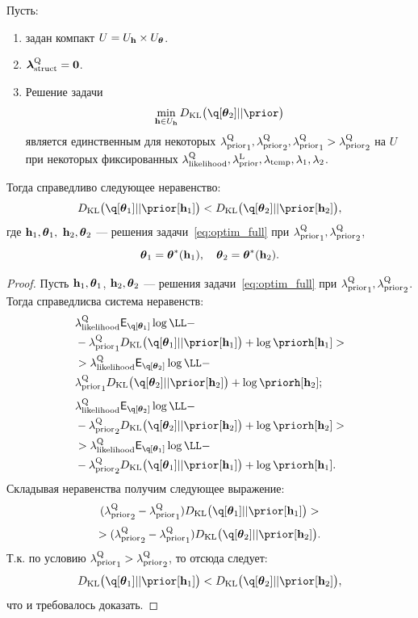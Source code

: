 \begin{lemma}
\label{lem:cp}
Пусть:
\begin{enumerate}
\item задан компакт $U = U_{\mathbf{h}} \times U_{\boldsymbol{\theta}}$. 
\item $\boldsymbol{\lambda}_\text{struct}^\text{Q}=\mathbf{0}$.
\item Решение задачи
\begin{equation}
\label{eq:cp_theorem_kl}
\min_{\h \in \Uh} \KL{\q[\teta_2]}{\prior}
\end{equation}
 является единственным для некоторых ${\lambda_\text{prior}^\text{Q}}_1, {\lambda_\text{prior}^\text{Q}}_2, {\lambda_\text{prior}^\text{Q}}_1 > {\lambda_\text{prior}^\text{Q}}_2$ на $U$ при некоторых фиксированных $\lambda_\text{likelihood}^\text{Q}, \lambda_\text{prior}^\text{L}, \lambda_{\text{temp}}, \lambda_1, \lambda_2$.
\end{enumerate}

Тогда справедливо следующее неравенство:
\[
    \KL{\q[\teta_1]}{\prior[\h_1]}  <   \KL{\q[\teta_2]}{\prior[\h_2]},
\]
где $\mathbf{h}_1, \boldsymbol{\theta}_1,$ $\mathbf{h}_2, \boldsymbol{\theta}_2$  --- решения задачи~\eqref{eq:optim_full} при ${\lambda_\text{prior}^\text{Q}}_1, {\lambda_\text{prior}^\text{Q}}_2$,
$$
\boldsymbol{\theta}_1 = \boldsymbol{\theta}^{*}(\mathbf{h}_1), \quad  \boldsymbol{\theta}_2 = \boldsymbol{\theta}^{*}(\mathbf{h}_2).
$$

\end{lemma}
\begin{proof}
Пусть $\mathbf{h}_1, \boldsymbol{\theta}_1$, $\mathbf{h}_2, \boldsymbol{\theta}_2$  --- решения задачи~\eqref{eq:optim_full} при ${\lambda_\text{prior}^\text{Q}}_1, {\lambda_\text{prior}^\text{Q}}_2$.
Тогда справедлисва система неравенств:
\begin{align*}
&\lamLL \E_{\q[\teta_1]}\log \LL - \\
&-{\lamCQ}_1\KL{\q[\teta_1]}{\prior[\h_1]} + \log\priorh[\h_1]> \\
&> \lamLL \E_{\q[\teta_2]}\log \LL - \\
&{\lamCQ}_1\KL{\q[\teta_2]}{\prior[\h_2]} + \log\priorh[\h_2];
\end{align*}
\begin{align*}
&\lamLL \E_{\q[\teta_2]}\log \LL - \\
&-{\lamCQ}_2\KL{\q[\teta_2]}{\prior[\h_2]} + \log\priorh[\h_2] >\\
&> \lamLL \E_{\q[\teta_1]}\log \LL -\\
&- {\lamCQ}_2\KL{\q[\teta_1]}{\prior[\h_1]} + \log\priorh[\h_1].
\end{align*}
Складывая неравенства получим следующее выражение:
\[
   ({\lamCQ}_2 - {\lamCQ}_1 )\KL{\q[\teta_1]}{\prior[\h_1]}  >
\]
\[
>    ({\lamCQ}_2 - {\lamCQ}_1 )\KL{\q[\teta_2]}{\prior[\h_2]}. 
\]
Т.к. по условию ${\lambda_\text{prior}^\text{Q}}_1 > {\lambda_\text{prior}^\text{Q}}_2$, то отсюда следует:
\[
    \KL{\q[\teta_1]}{\prior[\h_1]}  <   \KL{\q[\teta_2]}{\prior[\h_2]},
\]
что и требовалось доказать.
\end{proof}

